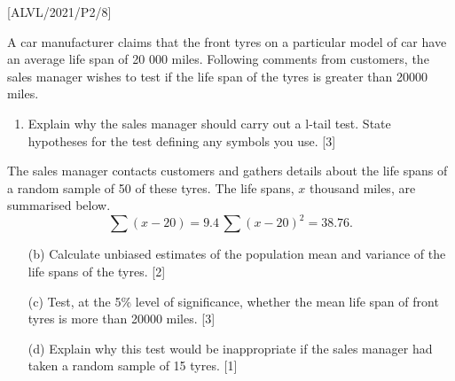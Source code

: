 \item {[}ALVL/2021/P2/8{]}

A car manufacturer claims that the front tyres on a particular model
of car have an average life span of 20 000 miles. Following comments
from customers, the sales manager wishes to test if the life span
of the tyres is greater than 20000 miles. 
\begin{enumerate}
\item Explain why the sales manager should carry out a l-tail test. State
hypotheses for the test defining any symbols you use. \hfill{} {[}3{]}
\end{enumerate}
The sales manager contacts customers and gathers details about the
life spans of a random sample of 50 of these tyres. The life spans,
$x$ thousand miles, are summarised below.
\[
\sum\left(x-20\right)=9.4\,\sum\left(x-20\right)^{2}=38.76.
\]

\begin{enumerate}
\item[(b)]  Calculate unbiased estimates of the population mean and variance
of the life spans of the tyres. \hfill{}{[}2{]}
\item[(c)] Test, at the 5\% level of significance, whether the mean life span
of front tyres is more than 20000 miles. \hfill{}{[}3{]}
\item[(d)] Explain why this test would be inappropriate if the sales manager
had taken a random sample of 15 tyres. \hfill{} {[}1{]}
\end{enumerate}
